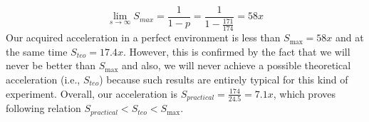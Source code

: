 \begin{equation}
    \label{eqn:amdalh-limit}
    \lim_{s\to\infty} S_{max} = \frac{1}{1-p} = \frac{1}{1-\frac{171}{174}} = 58x
    \tag{8}
\end{equation}
Our acquired acceleration in a perfect environment is less than $S _{\max} = 58x$ and at the same time $S_{teo} = 17.4x$.
However, this is confirmed by the fact that we will never be better than $S_{\max}$ and also, we will never achieve a
possible theoretical acceleration (i.e., $S_{teo}$) because such results are entirely typical for this kind of experiment.
Overall, our acceleration is $S_{practical} = \frac{174}{24.5} = 7.1x$, which proves following relation $S_{practical} < S_{teo} < S_{\max}$.


